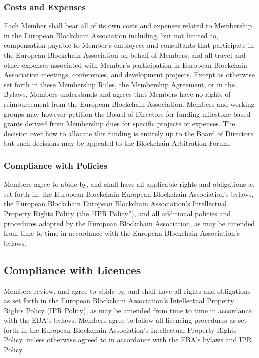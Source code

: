 \documentclass{article}
\begin{document}
\subsubsection{Costs and Expenses}

Each Member shall bear all of its own costs and expenses related to Membership in the European Blockchain Association including, but not limited to, compensation payable to Member’s employees and consultants that participate in the European Blockchain Association on behalf of Members, and all travel and other expenses associated with Member’s participation in European Blockchain Association meetings, conferences, and development projects. 
Except as otherwise set forth in these Membership Rules, the Membership Agreement, or in the Bylaws, Members understands and agrees that Members have no rights of reimbursement from the European Blockchain Association. 
Members and working groups may however petition the Board of Directors for funding milestone based grants derived from Membership dues for specific projects or expenses. 
The decision over how to allocate this funding is entirely up to the Board of Directors but such decisions may be appealed to the Blockchain Arbitration Forum.

\subsubsection{Compliance with Policies}

Members agree to abide by, and shall have all applicable rights and obligations as set forth in, the European Blockchain European Blockchain Association’s bylaws, the European Blockchain European Blockchain Association’s Intellectual Property Rights Policy (the “IPR Policy”), and all additional policies and procedures adopted by the European Blockchain Association, as may be amended from time to time in accordance with the European Blockchain Association’s bylaws.

\subsection{Compliance with Licences}

Members review, and agree to abide by, and shall have all rights and obligations as set forth in the European Blockchain Association’s Intellectual Property Rights Policy (IPR Policy), as may be amended from time to time in accordance with the EBA’s bylaws. 
Members agree to follow all licencing procedures as set forth in the European Blockchain Association’s Intellectual Property Rights Policy, unless otherwise agreed to in accordance with the EBA’s bylaws and IPR Policy.
\end{document}
